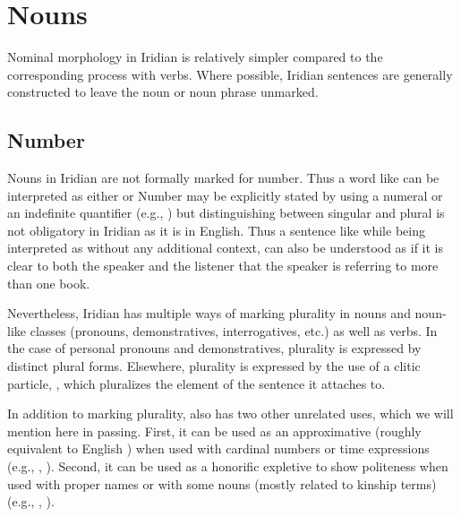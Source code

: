 \chapter{Nouns}

Nominal morphology in Iridian is relatively simpler compared to the
corresponding process with verbs. Where possible, Iridian sentences are
generally constructed to leave the noun or noun phrase unmarked.

\section{Number}\label{sec:number}

Nouns in Iridian are not formally marked for number. Thus a word like
 can be interpreted as either  or 
Number may be explicitly stated by using a numeral or an indefinite quantifier
(e.g.,    ) but distinguishing between
singular and plural is not obligatory in Iridian as it is in English. Thus a
sentence like  while being interpreted as  without any additional context, can also be understood as  if it is clear to both the speaker and the listener that
the speaker is referring to more than one book.

Nevertheless, Iridian has multiple ways of marking plurality in nouns and
noun-like classes (pronouns, demonstratives, interrogatives, etc.) as well as
verbs. In the case of personal pronouns and demonstratives, plurality is
expressed by distinct plural forms. Elsewhere, plurality is expressed by the use
of a clitic particle, , which pluralizes the element of the sentence it
attaches to. 

In addition to marking plurality,  also has two other unrelated uses,
which we will mention here in passing. First, it can be used as an approximative
 (roughly equivalent to English ) when used
with cardinal numbers or time expressions (e.g., , ). Second, it can be
used as a honorific expletive  to show
politeness when used with proper names or with some nouns
(mostly related to kinship terms) (e.g., , ).

